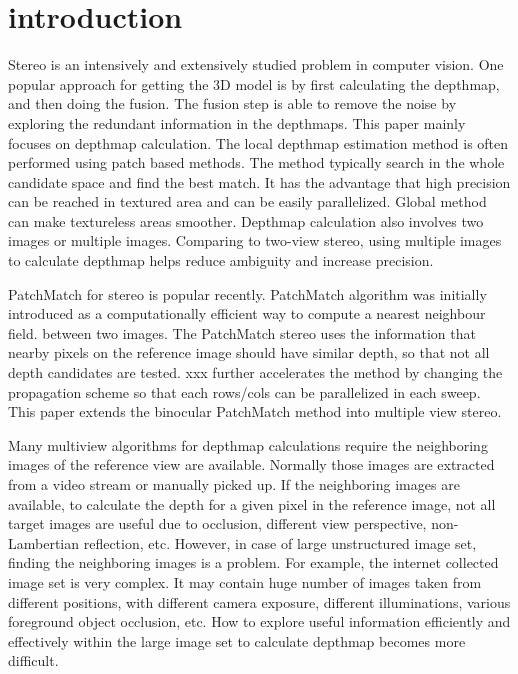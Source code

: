 \section{introduction}

Stereo is an intensively and extensively studied problem in computer vision. One popular approach for getting the 3D model is by first calculating the depthmap, and then doing the fusion. The fusion step is able to remove the noise by exploring the redundant information in the depthmaps. This paper mainly focuses on depthmap calculation. The local depthmap estimation method is often performed using patch based methods. The method typically search in the whole candidate space and find the best match. It has the advantage that high precision can be reached in textured area and can be easily parallelized. Global method can make textureless areas smoother. Depthmap calculation also involves two images or multiple images. Comparing to two-view stereo, using multiple images to calculate depthmap helps reduce ambiguity and increase precision. 

PatchMatch for stereo is popular recently. PatchMatch algorithm was initially introduced as a computationally efficient way to compute a nearest neighbour field. between two images. The PatchMatch stereo uses the information that nearby pixels on the reference image should have similar depth, so that not all depth candidates are tested. xxx further accelerates the method by changing the propagation scheme so that each rows/cols can be parallelized in each sweep. This paper extends the binocular PatchMatch method into multiple view stereo.

Many multiview algorithms for depthmap calculations require the neighboring images of the reference view are available. Normally those images are extracted from a video stream or manually picked up. If the neighboring images are available, to calculate the depth for a given pixel in the reference image, not all target images are useful due to occlusion, different view perspective, non-Lambertian reflection, etc. However, in case of large unstructured image set, finding the neighboring images is a problem. For example, the internet collected image set is very complex. It may contain huge number of images taken from different positions, with different camera exposure, different illuminations, various foreground object occlusion, etc. How to explore useful information efficiently and effectively within the large image set to calculate depthmap becomes more difficult.

